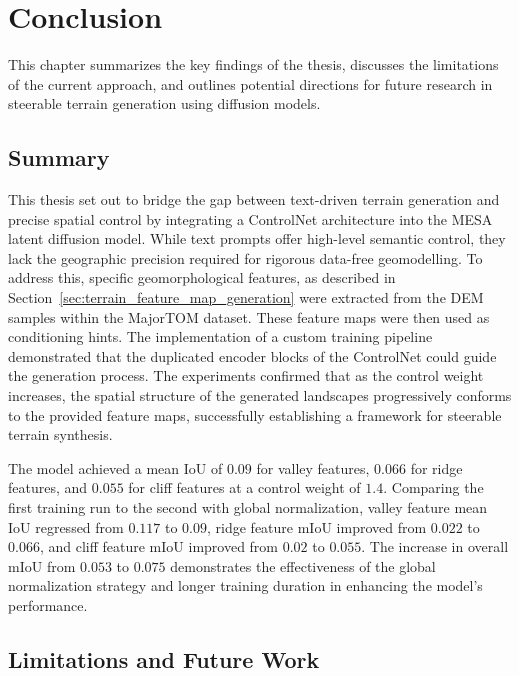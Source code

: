 \chapter{Conclusion}
\label{cha:conclusion}

This chapter summarizes the key findings of the thesis, discusses the limitations of the current approach, and outlines potential directions for future research in steerable terrain generation using diffusion models.

\section{Summary}
\label{sec:summary}

This thesis set out to bridge the gap between text-driven terrain generation and precise spatial control by integrating a ControlNet architecture into the MESA latent diffusion model. While text prompts offer high-level semantic control, they lack the geographic precision required for rigorous data-free geomodelling. To address this, specific geomorphological features, as described in Section~\ref{sec:terrain_feature_map_generation} were extracted from the DEM samples within the MajorTOM dataset. These feature maps were then used as conditioning hints. The implementation of a custom training pipeline demonstrated that the duplicated encoder blocks of the ControlNet could guide the generation process. The experiments confirmed that as the control weight increases, the spatial structure of the generated landscapes progressively conforms to the provided feature maps, successfully establishing a framework for steerable terrain synthesis.

The model achieved a mean IoU of $0.09$ for valley features, $0.066$ for ridge features, and $0.055$ for cliff features at a control weight of $1.4$. Comparing the first training run to the second with global normalization, valley feature mean IoU regressed from $0.117$ to $0.09$, ridge feature mIoU improved from $0.022$ to $0.066$, and cliff feature mIoU improved from $0.02$ to $0.055$. The increase in overall mIoU from $0.053$ to $0.075$ demonstrates the effectiveness of the global normalization strategy and longer training duration in enhancing the model's performance.

\section{Limitations and Future Work}
\label{sec:limitations}

